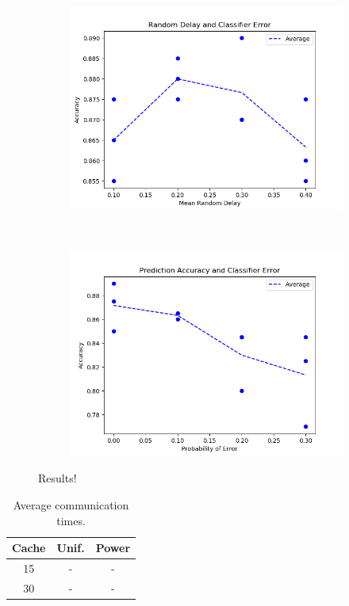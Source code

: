 \documentclass[12pt]{article}
\begin{document}
\begin{figure}
\begin{subfigure}{0.35\textwidth}
    \end{subfigure}
    \\
    \begin{subfigure}{0.35\textwidth}
        \includegraphics[width=\textwidth]{plot_2_final.png}
    \end{subfigure}
    ~
    \begin{subfigure}{0.35\textwidth}
        \includegraphics[width=\textwidth]{plot_1_final.png}
    \end{subfigure}
    \caption{Results!}
    \label{fig:results}
\end{figure}


\begin{table}
    \begin{tabular}{|c|c|c|}
        \hline
        Cache & Unif. & Power \\ \hline
        15 & - & - \\ \hline
        30 & - & - \\ \hline
    \end{tabular}
    \label{tab:cache}
    \caption{Average communication times.}%
\end{table}
\end{document}
